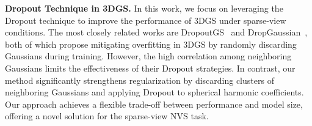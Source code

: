 \vspace{1mm}
\noindent\textbf{Dropout Technique in 3DGS.}
In this work, we focus on leveraging the Dropout technique to improve the performance of 3DGS under sparse-view conditions. The most closely related works are DropoutGS~\cite{xu2025Dropoutgs} and DropGaussian~\cite{park2025dropgaussian}, both of which propose mitigating overfitting in 3DGS by randomly discarding Gaussians during training.
%
However, the high correlation among neighboring Gaussians limits the effectiveness of their Dropout strategies. In contrast, our \methodname{} method significantly strengthens regularization by discarding clusters of neighboring Gaussians and applying Dropout to spherical harmonic coefficients. Our approach achieves a flexible trade-off between performance and model size, offering a novel solution for the sparse-view NVS task.



